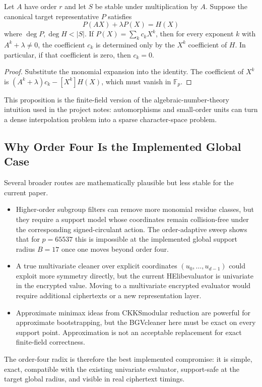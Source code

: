 \documentclass[a4paper,runningheads]{llncs}
\newcommand{\Fp}{\mathbb{F}_p}
\newcommand{\HElib}{\textsf{HElib}}
\newcommand{\BGV}{\textsf{BGV}}
\newcommand{\CKKS}{\textsf{CKKS}}
\begin{document}
\begin{proposition}
Let $A$ have order $r$ and let $S$ be stable under multiplication by $A$.
Suppose the canonical target representative $P$ satisfies
\[
  P(AX)+\lambda P(X)=H(X)
\]
where $\deg P,\deg H<|S|$.  If $P(X)=\sum_k c_kX^k$, then for every exponent
$k$ with $A^k+\lambda\ne0$, the coefficient $c_k$ is determined only by the
$X^k$ coefficient of $H$.  In particular, if that coefficient is zero, then
$c_k=0$.
\end{proposition}

\begin{proof}
Substitute the monomial expansion into the identity.  The coefficient of
$X^k$ is $(A^k+\lambda)c_k-[X^k]H(X)$, which must vanish in $\Fp$.
\end{proof}

This proposition is the finite-field version of the algebraic-number-theory
intuition used in the project notes: automorphisms and small-order units can
turn a dense interpolation problem into a sparse character-space problem.

\subsection{Why Order Four Is the Implemented Global Case}

Several broader routes are mathematically plausible but less stable for the
current paper.
\begin{itemize}[leftmargin=*]
  \item Higher-order subgroup filters can remove more monomial residue classes,
  but they require a support model whose coordinates remain collision-free under
  the corresponding signed-circulant action.  The order-adaptive sweep shows
  that for $p=65537$ this is impossible at the implemented global support radius
  $B=17$ once one moves beyond order four.
  \item A true multivariate cleaner over explicit coordinates
  $(u_0,\ldots,u_{d-1})$ could exploit more symmetry directly, but the current
  \HElib evaluator is univariate in the encrypted value.  Moving to a
  multivariate encrypted evaluator would require additional ciphertexts or a new
  representation layer.
  \item Approximate minimax ideas from \CKKS modular reduction are powerful for
  approximate bootstrapping, but the \BGV cleaner here must be exact on every
  support point.  Approximation is not an acceptable replacement for exact
  finite-field correctness.
\end{itemize}
The order-four radix is therefore the best implemented compromise: it is
simple, exact, compatible with the existing univariate evaluator, support-safe
at the target global radius, and visible in real ciphertext timings.
\end{document}
